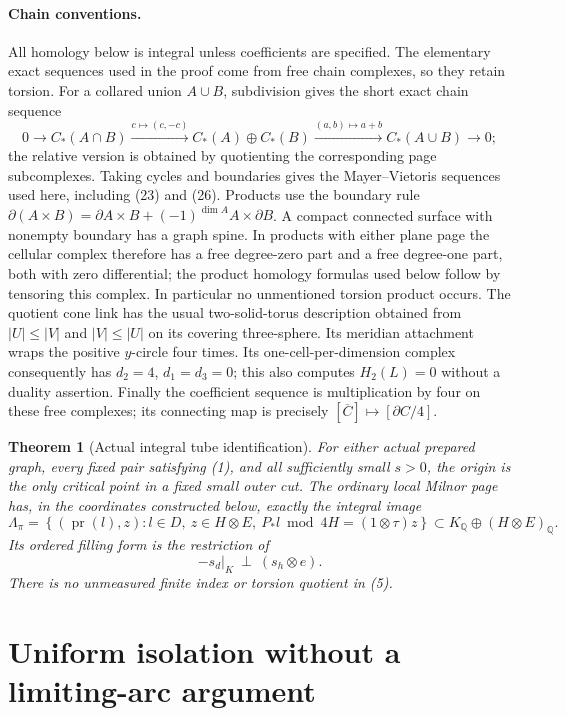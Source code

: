\documentclass[11pt]{article}
\newtheorem{theorem}{Theorem}
\newcommand{\Q}{\mathbb Q}
\newcommand{\pr}{\operatorname{pr}}
\begin{document}
\paragraph{Chain conventions.}
All homology below is integral unless coefficients are specified.
The elementary exact sequences used in the proof come from free
chain complexes, so they retain torsion. For a collared union
\(A\cup B\), subdivision gives the short exact chain sequence
\[
0\longrightarrow C_*(A\cap B)
\xrightarrow{c\mapsto(c,-c)}C_*(A)\oplus C_*(B)
\xrightarrow{(a,b)\mapsto a+b}C_*(A\cup B)\longrightarrow0;
\]
the relative version is obtained by quotienting the corresponding
page subcomplexes. Taking cycles and boundaries gives the
Mayer--Vietoris sequences used here, including (23) and (26).
Products use the boundary rule
\(\partial(A\times B)=\partial A\times B+
(-1)^{\dim A}A\times\partial B\).
A compact connected surface with nonempty boundary has a graph
spine. In products with either plane page the cellular complex
therefore has a free degree-zero part and a free degree-one part,
both with zero differential; the product homology formulas used
below follow by tensoring this complex. In particular no
unmentioned torsion product occurs.
The quotient cone link has the usual two-solid-torus description
obtained from \(|U|\le|V|\) and \(|V|\le|U|\) on its covering
three-sphere. Its meridian attachment wraps the positive \(y\)-circle
four times. Its one-cell-per-dimension complex consequently has
\(d_2=4\), \(d_1=d_3=0\); this also computes \(H_2(L)=0\)
without a duality assertion.
Finally the coefficient sequence is multiplication by four on
these free complexes; its connecting map is precisely
\([\overline C]\mapsto[\partial C/4]\).

\begin{theorem}[Actual integral tube identification]\label{thm:main}
For either actual prepared graph, every fixed pair satisfying (1),
and all sufficiently small \(s>0\), the origin is the only critical
point in a fixed small outer cut. The ordinary local Milnor page
has, in the coordinates constructed below, exactly the integral image
\[
 \Lambda_\pi=
 \left\{(\pr(l),z):l\in D,\ z\in H\otimes E,\
       P_*l\bmod4H=(1\otimes\tau)z\right\}
 \subset K_\Q\oplus(H\otimes E)_\Q .                \tag{5}
\]
Its ordered filling form is the restriction of
\[
              -s_d|_K\ \perp\ (s_h\otimes e).       \tag{6}
\]
There is no unmeasured finite index or torsion quotient in (5).
\end{theorem}

\section{Uniform isolation without a limiting-arc argument}
\end{document}
